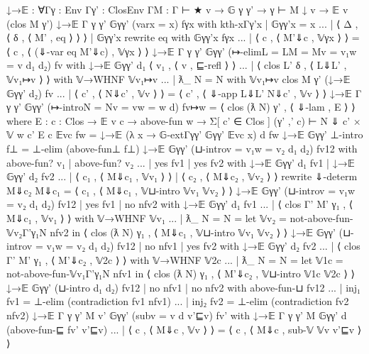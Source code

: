\begin{fence}
\begin{code}
↓→𝔼 : ∀{Γ}{γ : Env Γ}{γ' : ClosEnv Γ}{M : Γ ⊢ ★ }{v}
            → 𝔾 γ γ' → γ ⊢ M ↓ v → 𝔼 v (clos M γ')
↓→𝔼 {Γ} {γ} {γ'} 𝔾γγ' (var{x = x}) fγx
    with kth-x{Γ}{γ'}{x} | 𝔾γγ'{x = x}
... | ⟨ Δ , ⟨ δ , ⟨ M' , eq ⟩ ⟩ ⟩ | 𝔾γγ'x rewrite eq
    with 𝔾γγ'x fγx
... | ⟨ c , ⟨ M'⇓c , 𝕍γx ⟩ ⟩ =
      ⟨ c , ⟨ (⇓-var eq M'⇓c) , 𝕍γx ⟩ ⟩
↓→𝔼 {Γ} {γ} {γ'} 𝔾γγ' (↦-elim{L = L}{M = M}{v = v₁}{w = v} d₁ d₂) fv
    with ↓→𝔼 𝔾γγ' d₁ ⟨ v₁ , ⟨ v , ⊑-refl ⟩ ⟩
... | ⟨ clos L' δ , ⟨ L⇓L' , 𝕍v₁↦v ⟩ ⟩
    with 𝕍→WHNF 𝕍v₁↦v
... | ƛ_ {N = N}
    with 𝕍v₁↦v {clos M γ'} (↓→𝔼 𝔾γγ' d₂) fv
... | ⟨ c' , ⟨ N⇓c' , 𝕍v ⟩ ⟩ =
    ⟨ c' , ⟨ ⇓-app L⇓L' N⇓c' , 𝕍v ⟩ ⟩
↓→𝔼 {Γ} {γ} {γ'} 𝔾γγ' (↦-intro{N = N}{v = v}{w = w} d) fv↦w =
    ⟨ clos (ƛ N) γ' , ⟨ ⇓-lam , E ⟩ ⟩
    where E : {c : Clos} → 𝔼 v c → above-fun w
            → Σ[ c' ∈ Clos ] (γ' ,' c) ⊢ N ⇓ c'  ×  𝕍 w c'
          E {c} 𝔼vc fw = ↓→𝔼 (λ {x} → 𝔾-ext{Γ}{γ}{γ'} 𝔾γγ' 𝔼vc {x}) d fw
↓→𝔼 𝔾γγ' ⊥-intro f⊥ = ⊥-elim (above-fun⊥ f⊥)
↓→𝔼 𝔾γγ' (⊔-intro{v = v₁}{w = v₂} d₁ d₂) fv12
    with above-fun? v₁ | above-fun? v₂
... | yes fv1 | yes fv2
    with ↓→𝔼 𝔾γγ' d₁ fv1 | ↓→𝔼 𝔾γγ' d₂ fv2
... | ⟨ c₁ , ⟨ M⇓c₁ , 𝕍v₁ ⟩ ⟩ | ⟨ c₂ , ⟨ M⇓c₂ , 𝕍v₂ ⟩ ⟩
    rewrite ⇓-determ M⇓c₂ M⇓c₁ =
    ⟨ c₁ , ⟨ M⇓c₁ , 𝕍⊔-intro 𝕍v₁ 𝕍v₂ ⟩ ⟩
↓→𝔼 𝔾γγ' (⊔-intro{v = v₁}{w = v₂} d₁ d₂) fv12 | yes fv1 | no nfv2
    with ↓→𝔼 𝔾γγ' d₁ fv1
... | ⟨ clos {Γ'} M' γ₁ , ⟨ M⇓c₁ , 𝕍v₁ ⟩ ⟩
    with 𝕍→WHNF 𝕍v₁
... | ƛ_ {N = N} =
    let 𝕍v₂ = not-above-fun-𝕍{v₂}{Γ'}{γ₁}{N} nfv2 in
    ⟨ clos (ƛ N) γ₁ , ⟨ M⇓c₁ , 𝕍⊔-intro 𝕍v₁ 𝕍v₂ ⟩ ⟩
↓→𝔼 𝔾γγ' (⊔-intro{v = v₁}{w = v₂} d₁ d₂) fv12 | no nfv1  | yes fv2
    with ↓→𝔼 𝔾γγ' d₂ fv2
... | ⟨ clos {Γ'} M' γ₁ , ⟨ M'⇓c₂ , 𝕍2c ⟩ ⟩
    with 𝕍→WHNF 𝕍2c
... | ƛ_ {N = N} =
    let 𝕍1c = not-above-fun-𝕍{v₁}{Γ'}{γ₁}{N} nfv1 in
    ⟨ clos (ƛ N) γ₁ , ⟨ M'⇓c₂ , 𝕍⊔-intro 𝕍1c 𝕍2c ⟩ ⟩
↓→𝔼 𝔾γγ' (⊔-intro d₁ d₂) fv12 | no nfv1  | no nfv2
    with above-fun-⊔ fv12
... | inj₁ fv1 = ⊥-elim (contradiction fv1 nfv1)
... | inj₂ fv2 = ⊥-elim (contradiction fv2 nfv2)
↓→𝔼 {Γ} {γ} {γ'} {M} {v'} 𝔾γγ' (sub{v = v} d v'⊑v) fv'
    with ↓→𝔼 {Γ} {γ} {γ'} {M} 𝔾γγ' d (above-fun-⊑ fv' v'⊑v)
... | ⟨ c , ⟨ M⇓c , 𝕍v ⟩ ⟩ =
      ⟨ c , ⟨ M⇓c , sub-𝕍 𝕍v v'⊑v ⟩ ⟩
\end{code}
\end{fence}

